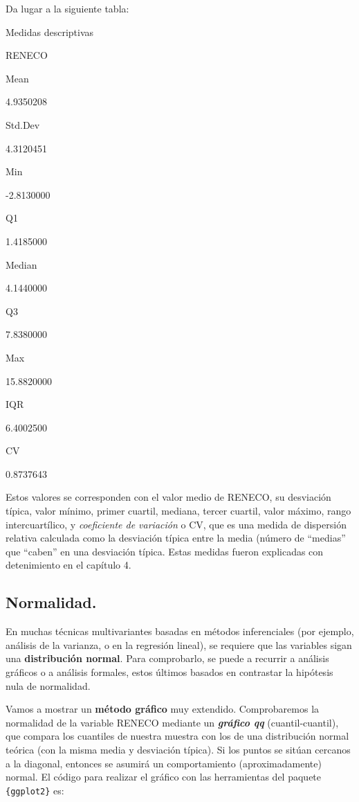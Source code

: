 \documentclass[
]{book}
\begin{document}
Da lugar a la siguiente tabla:

\label{tab:unnamed-chunk-170}Medidas descriptivas

RENECO

Mean

4.9350208

Std.Dev

4.3120451

Min

-2.8130000

Q1

1.4185000

Median

4.1440000

Q3

7.8380000

Max

15.8820000

IQR

6.4002500

CV

0.8737643

Estos valores se corresponden con el valor medio de RENECO, su desviación típica, valor mínimo, primer cuartil, mediana, tercer cuartil, valor máximo, rango intercuartílico, y \emph{coeficiente de variación} o CV, que es una medida de dispersión relativa calculada como la desviación típica entre la media (número de ``medias'' que ``caben'' en una desviación típica. Estas medidas fueron explicadas con detenimiento en el capítulo 4.

\subsection{Normalidad.}\label{normalidad.}

En muchas técnicas multivariantes basadas en métodos inferenciales (por ejemplo, análisis de la varianza, o en la regresión lineal), se requiere que las variables sigan una \textbf{distribución normal}. Para comprobarlo, se puede a recurrir a análisis gráficos o a análisis formales, estos últimos basados en contrastar la hipótesis nula de normalidad.

Vamos a mostrar un \textbf{método gráfico} muy extendido. Comprobaremos la normalidad de la variable RENECO mediante un \textbf{\emph{gráfico qq}} (cuantil-cuantil), que compara los cuantiles de nuestra muestra con los de una distribución normal teórica (con la misma media y desviación típica). Si los puntos se sitúan cercanos a la diagonal, entonces se asumirá un comportamiento (aproximadamente) normal. El código para realizar el gráfico con las herramientas del paquete \texttt{\{ggplot2\}} es:
\end{document}
